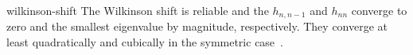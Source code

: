 \begin{Remark}{wilkinson-shift}
  The Wilkinson shift is reliable and the $h_{n,n-1}$ and $h_{nn}$
  converge to zero and the smallest eigenvalue by magnitude,
  respectively. They converge at least quadratically and cubically in
  the symmetric case~\cite[Section 8.2]{GolubVanLoan83}.
\end{Remark}




